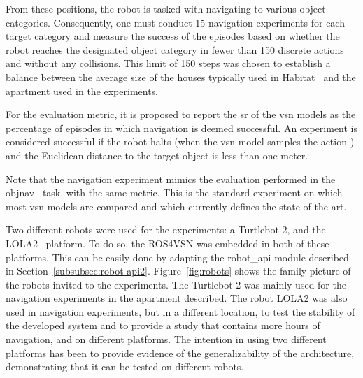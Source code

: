 From these positions, the robot is tasked with navigating to various object categories.
Consequently, one must conduct 15 navigation experiments for each target category and measure the success of the episodes based on whether the robot reaches the designated object category in fewer than 150 discrete actions and without any collisions.
This limit of 150 steps was chosen to establish a balance between the average size of the houses typically used in Habitat~\cite{NEURIPS2021_021bbc7e} and the apartment used in the experiments.

For the evaluation metric, it is proposed to report the \acrfull{sr} of the \acrshort{vsn} models as the percentage of episodes in which navigation is deemed successful.
An experiment is considered successful if the robot halts (when the \acrshort{vsn} model samples the action \stopac) and the Euclidean distance to the target object is less than one meter.

Note that the navigation experiment mimics the evaluation performed in the \acrshort{objnav}~\cite{batra2020} task, with the same metric.
This is the standard experiment on which most \acrshort{vsn} models are compared and which currently defines the state of the art.


Two different robots were used for the experiments: a Turtlebot 2, and the LOLA2~\cite{LOLA} platform.
To do so, the ROS4VSN was embedded in both of these platforms.
This can be easily done by adapting the robot\_api module described in Section~\ref{subsubsec:robot-api2}.
Figure~\ref{fig:robots} shows the family picture of the robots invited to the experiments.
The Turtlebot 2 was mainly used for the navigation experiments in the apartment described.
The robot LOLA2 was also used in navigation experiments, but in a different location, to test the stability of the developed system and to provide a study that contains more hours of navigation, and on different platforms.
The intention in using two different platforms has been to provide evidence of the generalizability of the architecture, demonstrating that it can be tested on different robots.


